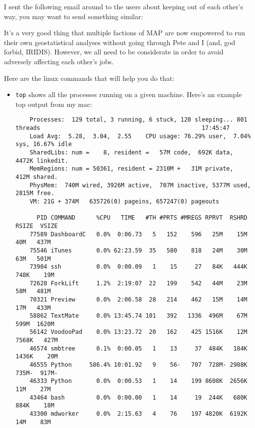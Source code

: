 I sent the following email around to the users about keeping out of each other's way, you may want to send something similar:

\bigskip
{\sffamily

It's a very good thing that multiple factions of MAP are now empowered to run their own geostatistical analyses without going through Pete and I (and, god forbid, IRIDIS). However, we all need to be considerate in order to avoid adversely affecting each other's jobs.


Here are the linux commands that will help you do that:

\begin{itemize}
    \item \texttt{top} shows all the processes running on a given machine. Here's an example top output from my mac:

    \begin{verbatim}
    Processes:  129 total, 3 running, 6 stuck, 120 sleeping... 801 threads                                              17:45:47
    Load Avg:  5.28,  3.04,  2.55    CPU usage: 76.29% user,  7.04% sys, 16.67% idle
    SharedLibs: num =    8, resident =   57M code,  692K data, 4472K linkedit.
    MemRegions: num = 50361, resident = 2310M +   31M private,  412M shared.
    PhysMem:  740M wired, 3926M active,  707M inactive, 5377M used, 2815M free.
    VM: 21G + 374M   635726(0) pageins, 657247(0) pageouts

      PID COMMAND      %CPU   TIME   #TH #PRTS #MREGS RPRVT  RSHRD  RSIZE  VSIZE
    77589 DashboardC   0.0%  0:06.73   5   152    596   25M    15M    40M   437M 
    75546 iTunes       0.0% 62:23.59  35   580    818   24M    30M    63M   501M 
    73904 ssh          0.0%  0:00.09   1    15     27   84K   444K   748K    19M 
    72628 ForkLift     1.2%  2:19:07  22   199    542   44M    23M    58M   481M 
    70321 Preview      0.0%  2:06.58  28   214    462   15M    14M    17M   433M 
    58862 TextMate     0.0% 13:45.74 101   392   1336  496M    67M   599M  1620M 
    56142 VoodooPad    0.0% 13:23.72  20   162    425 1516K    12M  7568K   427M 
    46574 smbtree      0.1%  0:00.05   1    13     37  484K   184K  1436K    20M 
    46555 Python     586.4% 10:01.92   9    56-   707  728M- 2988K   735M-  917M-
    46333 Python       0.0%  0:00.53   1    14    199 8608K  2656K    11M    27M 
    43464 bash         0.0%  0:00.00   1    14     19  244K   680K   884K    18M 
    43300 mdworker     0.0%  2:15.63   4    76    197 4820K  6192K    14M    83M     
    \end{verbatim}


\end{itemize}}
